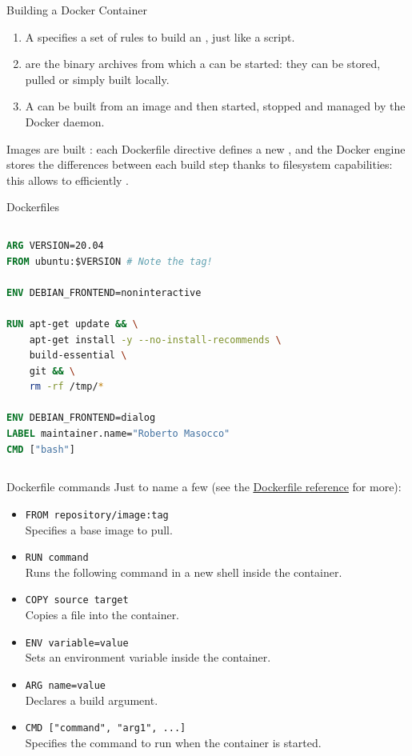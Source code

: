 \begin{frame}{Building a Docker Container}
\begin{enumerate}
  \item A  specifies a set of rules to build an , just like a script.
  \item {} are the binary archives from which a  can be started: they can be stored, pulled or simply built locally.
  \item A  can be built from an image and then started, stopped and managed by the Docker daemon.
\end{enumerate}
Images are built : each Dockerfile directive defines a new , and the Docker engine stores the differences between each build step thanks to filesystem capabilities: this allows to efficiently .
\end{frame}

\begin{frame}[fragile]{Dockerfiles}
\begin{columns}
\begin{lstlisting}[language=Dockerfile, caption=Minimal example of a Dockerfile running an Ubuntu image in a container]
ARG VERSION=20.04
FROM ubuntu:$VERSION # Note the tag!

ENV DEBIAN_FRONTEND=noninteractive

RUN apt-get update && \
    apt-get install -y --no-install-recommends \
    build-essential \
    git && \
    rm -rf /tmp/*

ENV DEBIAN_FRONTEND=dialog
LABEL maintainer.name="Roberto Masocco"
CMD ["bash"]
\end{lstlisting}
\end{columns}
\end{frame}
\begin{frame}{Dockerfile commands}
Just to name a few (see the \href{https://docs.docker.com/engine/reference/builder/}{\color{blue}\underline{Dockerfile reference}} for more):
\begin{itemize}
  \item \texttt{FROM repository/image:tag}\\Specifies a base image to pull.
  \item \texttt{RUN command}\\Runs the following command in a new shell inside the container.
  \item \texttt{COPY source target}\\Copies a file into the container.
  \item \texttt{ENV variable=value}\\Sets an environment variable inside the container.
  \item \texttt{ARG name=value}\\Declares a build argument.
  \item \texttt{CMD ["command", "arg1", ...]}\\Specifies the command to run when the container is started.
\end{itemize}
\end{frame}
